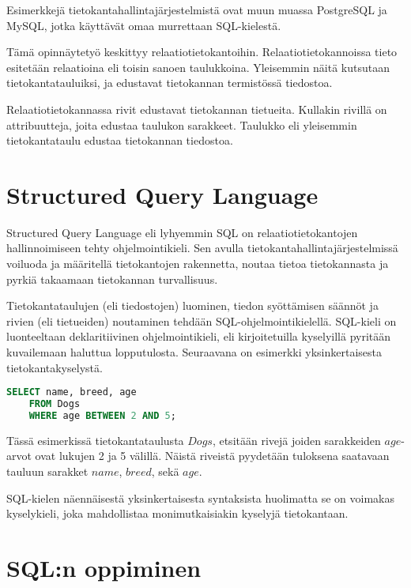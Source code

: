 \documentclass[finnish,twoside,openright]{HYgraduMLDS}
\begin{document}
Esimerkkejä tietokantahallintajärjestelmistä ovat muun muassa PostgreSQL ja MySQL, jotka käyttävät omaa murrettaan SQL-kielestä.

Tämä opinnäytetyö keskittyy relaatiotietokantoihin. Relaatiotietokannoissa tieto esitetään relaatioina eli toisin sanoen taulukkoina\cite{tikape2019}. Yleisemmin näitä kutsutaan tietokantatauluiksi, ja edustavat tietokannan termistössä tiedostoa.

Relaatiotietokannassa rivit edustavat tietokannan tietueita. Kullakin rivillä on attribuutteja, joita edustaa taulukon sarakkeet. Taulukko eli yleisemmin tietokantataulu edustaa tietokannan tiedostoa.


\section{Structured Query Language}

Structured Query Language eli lyhyemmin SQL on relaatiotietokantojen\cite{Codd:1970:RMD:362384.362685} hallinnoimiseen tehty ohjelmointikieli\cite{tikape2019}. Sen avulla tietokantahallintajärjestelmissä voiluoda ja määritellä tietokantojen rakennetta, noutaa tietoa tietokannasta ja pyrkiä takaamaan tietokannan turvallisuus\cite{wilton2005beginning}.

Tietokantataulujen (eli tiedostojen) luominen, tiedon syöttämisen säännöt ja rivien (eli tietueiden) noutaminen tehdään SQL-ohjelmointikielellä. SQL-kieli on luonteeltaan deklaritiivinen ohjelmointikieli\cite{sadiq2004sqlator}, eli kirjoitetuilla kyselyillä pyritään kuvailemaan haluttua lopputulosta. Seuraavana on esimerkki yksinkertaisesta tietokantakyselystä.

\begin{lstlisting}[language=SQL]
    SELECT name, breed, age
    FROM Dogs
    WHERE age BETWEEN 2 AND 5;
\end{lstlisting}

Tässä esimerkissä tietokantataulusta $Dogs$, etsitään rivejä joiden sarakkeiden $age$-arvot ovat lukujen 2 ja 5 välillä. Näistä riveistä pyydetään tuloksena saatavaan tauluun sarakket $name$, $breed$, sekä $age$.

SQL-kielen näennäisestä yksinkertaisesta syntaksista huolimatta se on voimakas kyselykieli, joka mahdollistaa monimutkaisiakin kyselyjä tietokantaan.


\section{SQL:n oppiminen}
\end{document}
